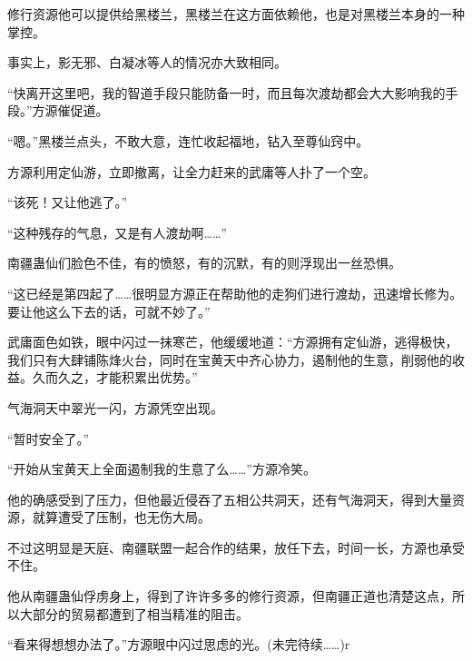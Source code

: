 \begin{this_body}
修行资源他可以提供给黑楼兰，黑楼兰在这方面依赖他，也是对黑楼兰本身的一种掌控。

事实上，影无邪、白凝冰等人的情况亦大致相同。

“快离开这里吧，我的智道手段只能防备一时，而且每次渡劫都会大大影响我的手段。”方源催促道。

“嗯。”黑楼兰点头，不敢大意，连忙收起福地，钻入至尊仙窍中。

方源利用定仙游，立即撤离，让全力赶来的武庸等人扑了一个空。

“该死！又让他逃了。”

“这种残存的气息，又是有人渡劫啊……”

南疆蛊仙们脸色不佳，有的愤怒，有的沉默，有的则浮现出一丝恐惧。

“这已经是第四起了……很明显方源正在帮助他的走狗们进行渡劫，迅速增长修为。要让他这么下去的话，可就不妙了。”

武庸面色如铁，眼中闪过一抹寒芒，他缓缓地道：“方源拥有定仙游，逃得极快，我们只有大肆铺陈烽火台，同时在宝黄天中齐心协力，遏制他的生意，削弱他的收益。久而久之，才能积累出优势。”

气海洞天中翠光一闪，方源凭空出现。

“暂时安全了。”

“开始从宝黄天上全面遏制我的生意了么……”方源冷笑。

他的确感受到了压力，但他最近侵吞了五相公共洞天，还有气海洞天，得到大量资源，就算遭受了压制，也无伤大局。

不过这明显是天庭、南疆联盟一起合作的结果，放任下去，时间一长，方源也承受不住。

他从南疆蛊仙俘虏身上，得到了许许多多的修行资源，但南疆正道也清楚这点，所以大部分的贸易都遭到了相当精准的阻击。

“看来得想想办法了。”方源眼中闪过思虑的光。(未完待续……)r

\end{this_body}

